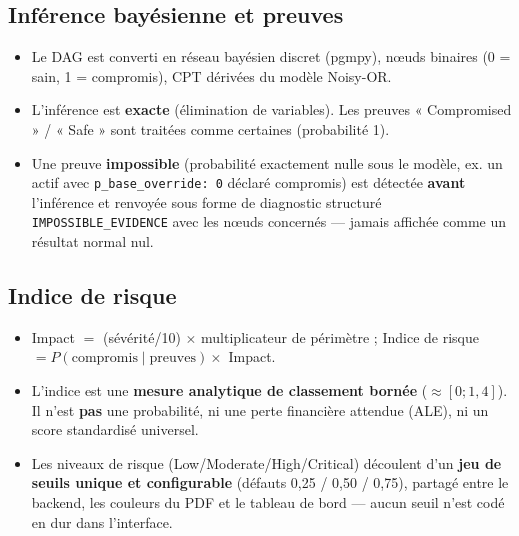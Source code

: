 \documentclass[12pt,a4paper]{article}
\newcommand{\forcereset}[1]{%
    \needspace{#1\baselineskip}%
}
\begin{document}
\subsection{Inférence bayésienne et preuves}
\forcereset{4}
\begin{itemize}[leftmargin=1.2cm, itemsep=0.2\baselineskip]
    \item Le DAG est converti en réseau bayésien discret (pgmpy), nœuds binaires (0 = sain, 1 = compromis), CPT dérivées du modèle Noisy-OR.
    \item L'inférence est \textbf{exacte} (élimination de variables). Les preuves « Compromised » / « Safe » sont traitées comme certaines (probabilité 1).
    \item Une preuve \textbf{impossible} (probabilité exactement nulle sous le modèle, ex. un actif avec \texttt{p\_base\_override: 0} déclaré compromis) est détectée \textbf{avant} l'inférence et renvoyée sous forme de diagnostic structuré \texttt{IMPOSSIBLE\_EVIDENCE} avec les nœuds concernés — jamais affichée comme un résultat normal nul.
\end{itemize}

\subsection{Indice de risque}
\forcereset{4}
\begin{itemize}[leftmargin=1.2cm, itemsep=0.2\baselineskip]
    \item Impact $=$ (sévérité/10) $\times$ multiplicateur de périmètre ; Indice de risque $= P(\text{compromis}\mid\text{preuves})\times$ Impact.
    \item L'indice est une \textbf{mesure analytique de classement bornée} ($\approx[0;1{,}4]$). Il n'est \textbf{pas} une probabilité, ni une perte financière attendue (ALE), ni un score standardisé universel.
    \item Les niveaux de risque (Low/Moderate/High/Critical) découlent d'un \textbf{jeu de seuils unique et configurable} (défauts 0{,}25 / 0{,}50 / 0{,}75), partagé entre le backend, les couleurs du PDF et le tableau de bord — aucun seuil n'est codé en dur dans l'interface.
\end{itemize}
\end{document}
